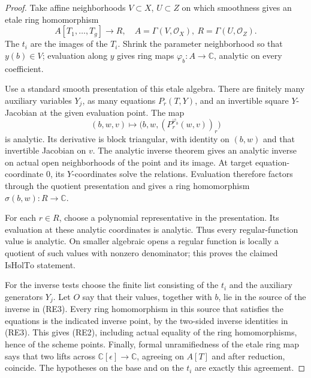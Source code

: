 \begin{proof}
Take affine neighborhoods \(V\subset X\), \(U\subset Z\)
on which smoothness gives an etale ring homomorphism
\[
                A[T_1,\ldots,T_g]\longrightarrow R,
       \quad A=\Gamma(V,\mathcal O_X),\
             R=\Gamma(U,\mathcal O_Z).
\]
The \(t_i\) are the images of the \(T_i\).
Shrink the parameter neighborhood so that \(y(b)\in V\);
evaluation along \(y\) gives ring maps
\(\varphi_b:A\to\mathbb C\), analytic on every coefficient.

Use a standard smooth presentation of this etale algebra.
There are finitely many auxiliary variables \(Y_j\),
as many equations \(P_r(T,Y)\), and an invertible square
\(Y\)-Jacobian at the given evaluation point.
The map
\[
 (b,w,v)\longmapsto
 \bigl(b,w,(P_r^{\varphi_b}(w,v))_r\bigr)                    \tag{RE3}
\]
is analytic.
Its derivative is block triangular, with identity on
\((b,w)\) and that invertible Jacobian on \(v\).
The analytic inverse theorem gives an analytic inverse
on actual open neighborhoods of the point and its image.
At target equation-coordinate \(0\), its \(Y\)-coordinates
solve the relations.
Evaluation therefore factors through the quotient
presentation and gives a ring homomorphism
\(\sigma(b,w):R\to\mathbb C\).

For each \(r\in R\), choose a polynomial representative
in the presentation.
Its evaluation at these analytic coordinates is analytic.
Thus every regular-function value is analytic.
On smaller algebraic opens a regular function is locally
a quotient of such values with nonzero denominator;
this proves the claimed \(\mathrm{IsHolTo}\) statement.

For the inverse tests choose the finite list consisting
of the \(t_i\) and the auxiliary generators \(Y_j\).
Let \(O\) say that their values, together with \(b\),
lie in the source of the inverse in (RE3).
Every ring homomorphism in this source that satisfies
the equations is the indicated inverse point, by the
two-sided inverse identities in (RE3).
This gives (RE2), including actual equality of the
ring homomorphisms, hence of the scheme points.
Finally, formal unramifiedness of the etale ring map
says that two lifts across
\(\mathbb C[\epsilon]\to\mathbb C\), agreeing on \(A[T]\)
and after reduction, coincide.
The hypotheses on the base and on the \(t_i\) are exactly
this agreement.
\end{proof}

